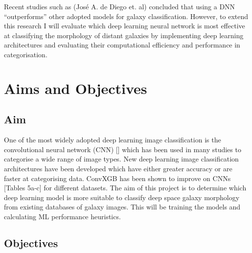 \documentclass[runningheads]{llncs}
\begin{document}
Recent studies such as (José A. de Diego et. al) \cite{GCDL} concluded that
using a DNN “outperforms” other adopted models for galaxy classification.
However, to extend this research I will evaluate which deep learning neural
network is most effective at classifying the morphology of distant galaxies by
implementing deep learning architectures and evaluating their computational
efficiency and performance in categorisation.

\section{Aims and Objectives}

\subsection{Aim}
One of the most widely adopted deep learning image classification is the
convolutional neural network (CNN) [] which has been used in many studies to
categorise a wide range of image types. New deep learning image classification
architectures have been developed which have either greater accuracy or are
faster at categorising data. ConvXGB has been shown to improve on
CNNs [Tables 5a-c] for different datasets. The aim of this project is to
determine which deep learning model is more suitable to classify deep space
galaxy morphology from existing databases of galaxy images. This will be
training the models and calculating ML performance heuristics.

\subsection{Objectives}
\end{document}
